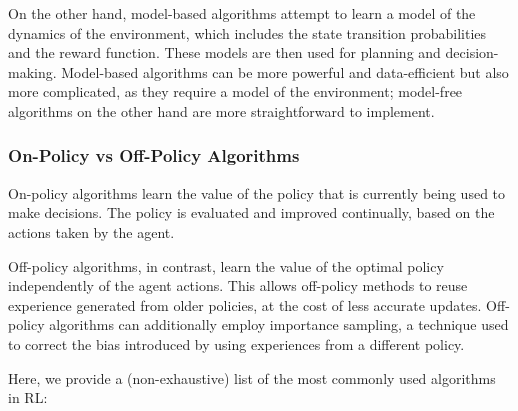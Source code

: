 On the other hand, model-based algorithms attempt to learn a model of the dynamics of the environment, which includes the state transition probabilities and the reward function.
These models are then used for planning and decision-making.
Model-based algorithms can be more powerful and data-efficient but also more complicated, as they require a model of the environment; model-free algorithms on the other hand are more straightforward to implement.

\subsubsection{On-Policy vs Off-Policy Algorithms}

On-policy algorithms learn the value of the policy that is currently being used to make decisions. 
The policy is evaluated and improved continually, based on the actions taken by the agent.

Off-policy algorithms, in contrast, learn the value of the optimal policy independently of the agent actions.
This allows off-policy methods to reuse experience generated from older policies, at the cost of less accurate updates.
Off-policy algorithms can additionally employ importance sampling, a technique used to correct the bias introduced by using experiences from a different policy.

Here, we provide a (non-exhaustive) list of the most commonly used algorithms in RL:

